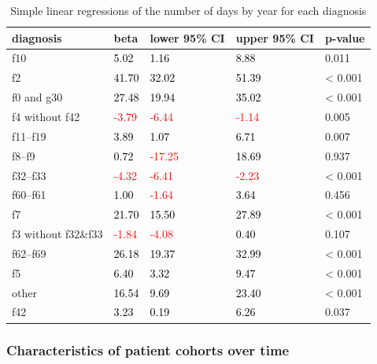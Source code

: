 \documentclass[
  openany]{book}
\theoremstyle{definition}
\theoremstyle{definition}
\theoremstyle{definition}
\theoremstyle{definition}
\theoremstyle{remark}
\begin{document}
\begin{table}
\centering
\caption{\label{tab:days-by-year}Simple linear regressions of the number of days by year for each diagnosis}
\centering
\begin{tabular}[t]{l>{}l>{}l>{}ll}
\toprule
diagnosis & beta & lower 95\% CI & upper 95\% CI & p-value\\
\midrule
f10 & \textcolor{black}{5.02} & \textcolor{black}{1.16} & \textcolor{black}{8.88} & 0.011\\
f2 & \textcolor{black}{41.70} & \textcolor{black}{32.02} & \textcolor{black}{51.39} & < 0.001\\
f0 and g30 & \textcolor{black}{27.48} & \textcolor{black}{19.94} & \textcolor{black}{35.02} & < 0.001\\
f4 without f42 & \textcolor{red}{-3.79} & \textcolor{red}{-6.44} & \textcolor{red}{-1.14} & 0.005\\
f11–f19 & \textcolor{black}{3.89} & \textcolor{black}{1.07} & \textcolor{black}{6.71} & 0.007\\
\addlinespace
f8–f9 & \textcolor{black}{0.72} & \textcolor{red}{-17.25} & \textcolor{black}{18.69} & 0.937\\
f32–f33 & \textcolor{red}{-4.32} & \textcolor{red}{-6.41} & \textcolor{red}{-2.23} & < 0.001\\
f60–f61 & \textcolor{black}{1.00} & \textcolor{red}{-1.64} & \textcolor{black}{3.64} & 0.456\\
f7 & \textcolor{black}{21.70} & \textcolor{black}{15.50} & \textcolor{black}{27.89} & < 0.001\\
f3 without f32\&f33 & \textcolor{red}{-1.84} & \textcolor{red}{-4.08} & \textcolor{black}{0.40} & 0.107\\
\addlinespace
f62–f69 & \textcolor{black}{26.18} & \textcolor{black}{19.37} & \textcolor{black}{32.99} & < 0.001\\
f5 & \textcolor{black}{6.40} & \textcolor{black}{3.32} & \textcolor{black}{9.47} & < 0.001\\
other & \textcolor{black}{16.54} & \textcolor{black}{9.69} & \textcolor{black}{23.40} & < 0.001\\
f42 & \textcolor{black}{3.23} & \textcolor{black}{0.19} & \textcolor{black}{6.26} & 0.037\\
\bottomrule
\end{tabular}
\end{table}

\subsubsection{Characteristics of patient cohorts over time}\label{characteristics-of-patient-cohorts-over-time}
\end{document}
